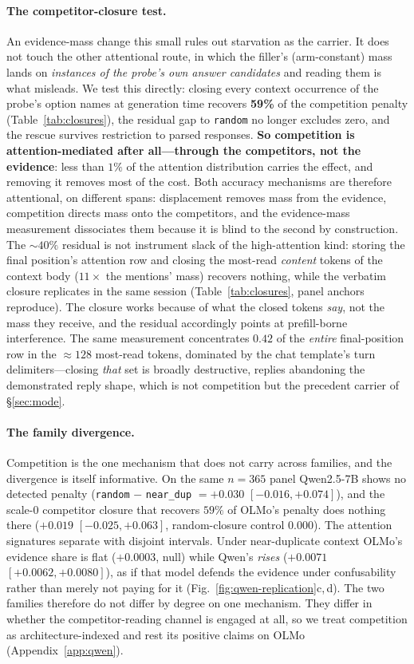 \documentclass{article}
\begin{document}
\paragraph{The competitor-closure test.}
An evidence-mass change this small rules out starvation as the carrier. It does not
touch the other attentional route,
in which the filler's (arm-constant) mass lands on \emph{instances of the probe's own answer
candidates} and reading them is what misleads. We test this directly: closing every context
occurrence of the probe's option names at generation time recovers \textbf{59\%} of the
competition penalty (Table~\ref{tab:closures}), the residual gap to \texttt{random} no longer
excludes zero, and the rescue survives restriction to parsed responses. \textbf{So
competition is attention-mediated after all---through the competitors, not the evidence}: less
than $1\%$ of the attention distribution carries the effect, and removing it removes most of
the cost. Both accuracy mechanisms are therefore attentional, on different spans: displacement
removes mass from the evidence, competition directs mass onto the competitors, and the
evidence-mass measurement dissociates them because it is blind to the second by construction.
The ${\sim}40\%$ residual is not instrument slack of the high-attention kind: storing the
final position's attention row and closing the most-read \emph{content} tokens of the context
body ($11\times$ the mentions' mass) recovers nothing, while the verbatim closure replicates
in the same session (Table~\ref{tab:closures}, panel anchors reproduce). The closure works
because of what the closed tokens \emph{say}, not the mass they receive, and the residual
accordingly points at prefill-borne interference. The same measurement concentrates $0.42$ of
the \emph{entire} final-position row in the ${\approx}128$ most-read tokens, dominated by the
chat template's turn delimiters---closing \emph{that} set
is broadly destructive, replies abandoning the demonstrated reply shape, which is not
competition but the precedent carrier of \S\ref{sec:mode}.

\paragraph{The family divergence.}
Competition is the one mechanism that does not carry across families, and the divergence is
itself informative. On the same $n{=}365$ panel Qwen2.5-7B shows no detected penalty
(\texttt{random} $-$ \texttt{near\_dup} $= +0.030$ $[-0.016,+0.074]$), and the scale-$0$
competitor closure that recovers $59\%$ of OLMo's penalty does nothing there ($+0.019$
$[-0.025,+0.063]$, random-closure control $0.000$). The attention signatures separate with
disjoint intervals. Under near-duplicate context OLMo's evidence share is flat ($+0.0003$,
null) while Qwen's \emph{rises} ($+0.0071$ $[+0.0062,+0.0080]$), as if that model defends the
evidence under confusability rather than merely not paying for it
(Fig.~\ref{fig:qwen-replication}c,\,d). The two families therefore do not differ by degree on
one mechanism. They differ in whether the competitor-reading channel is engaged at all, so we
treat competition as architecture-indexed and rest its positive claims on OLMo
(Appendix~\ref{app:qwen}).
\end{document}
